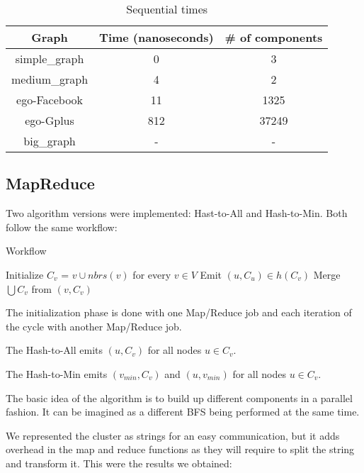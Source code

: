 \begin{table}[h!]
\footnotesize
\begin{center}
\begin{tabular}{|c|c|c|}
\hline
{\bf Graph} & {\bf Time (nanoseconds)}& {\bf \# of components} \\
\hline
\hline
simple\_graph   & 0  & 3  \\
\hline
medium\_graph   & 4  & 2   \\
\hline
ego-Facebook   & 11  & 1325  \\
\hline
ego-Gplus   & 812 & 37249 \\
\hline
big\_graph   & -  & -  \\
\hline
\end{tabular}
\caption{Sequential times}
\label{tb:sequentialtimes}
\end{center}
\end{table}

\subsection{MapReduce}

Two algorithm versions were implemented: Hast-to-All and Hash-to-Min. Both follow the same workflow:

\begin{algorithm}
\caption{Workflow}
\label{algo:workflow}
\begin{algorithmic}[1]
\State Initialize $C_{v}$ = ${v} \cup nbrs(v)$ for every $v \in V$
\Repeat
\State Emit $(u, C_u) \in h(C_ v)$
\State Merge $\bigcup C_v$ from $(v, C_v)$ 
\end{algorithmic}
\end{algorithm}

The initialization phase is done with one Map/Reduce job and each iteration of the cycle with another Map/Reduce job.

The Hash-to-All emits $(u, C_v)$ for all nodes $u \in C_v$.

The Hash-to-Min emits $(v_{min}, C_v)$ and $(u, v_{min})$ for all nodes $u \in C_v$.

The basic idea of the algorithm is to build up different components in a parallel fashion. It can be imagined as a different BFS being performed at the same time.

We represented the cluster as strings for an easy communication, but it adds overhead in the map and reduce functions as they will require to split the string and transform it. This were the results we obtained:


